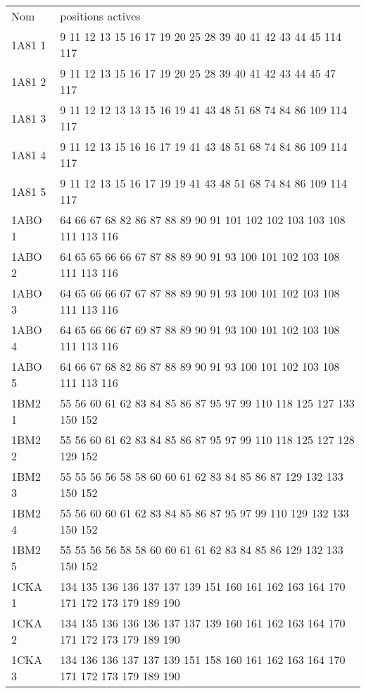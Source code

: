     \begin{table}[!htbp]
      \centering

      \begin{tabular}{ll}

        \toprule
        Nom & positions actives \\
        \cmidrule{1-2}
        1A81 1 & 9 11 12 13 15 16 17 19 20 25 28 39 40 41 42 43 44 45 114 117 \\
        1A81 2 & 9 11 12 13 15 16 17 19 20 25 28 39 40 41 42 43 44 45 47 117 \\
        1A81 3 & 9 11 12 12 13 13 15 16 19 41 43 48 51 68 74 84 86 109 114 117 \\
        1A81 4 & 9 11 12 13 15 16 16 17 19 41 43 48 51 68 74 84 86 109 114 117 \\
        1A81 5 & 9 11 12 13 15 16 17 19 19 41 43 48 51 68 74 84 86 109 114 117 \\
        1ABO 1 & 64 66 67 68 82 86 87 88 89 90 91 101 102 102 103 103 108 111 113 116 \\
        1ABO 2 & 64 65 65 66 66 67 87 88 89 90 91 93 100 101 102 103 108 111 113 116 \\
        1ABO 3 & 64 65 66 66 67 67 87 88 89 90 91 93 100 101 102 103 108 111 113 116 \\
        1ABO 4 & 64 65 66 66 67 69 87 88 89 90 91 93 100 101 102 103 108 111 113 116 \\
        1ABO 5 & 64 66 67 68 82 86 87 88 89 90 91 93 100 101 102 103 108 111 113 116 \\
        1BM2 1 & 55 56 60 61 62 83 84 85 86 87 95 97 99 110 118 125 127 133 150 152 \\
        1BM2 2 & 55 56 60 61 62 83 84 85 86 87 95 97 99 110 118 125 127 128 129 152 \\
        1BM2 3 & 55 55 56 56 58 58 60 60 61 62 83 84 85 86 87 129 132 133 150 152 \\
        1BM2 4 & 55 56 60 60 61 62 83 84 85 86 87 95 97 99 110 129 132 133 150 152 \\
        1BM2 5 & 55 55 56 56 58 58 60 60 61 61 62 83 84 85 86 129 132 133 150 152 \\
        1CKA 1 & 134 135 136 136 137 137 139 151 160 161 162 163 164 170 171 172 173 179 189 190 \\
        1CKA 2 & 134 135 136 136 136 137 137 139 160 161 162 163 164 170 171 172 173 179 189 190 \\
        1CKA 3 & 134 136 136 137 137 139 151 158 160 161 162 163 164 170 171 172 173 179 189 190 \\

\end{tabular}
\end{table}
